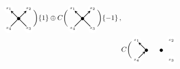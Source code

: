 \documentclass{compositio}
\theoremstyle{definition}
\numberwithin{equation}{section}
\begin{document}
\begin{align}
\begin{tikzpicture}[scale=0.5,baseline=-2pt, inner sep=1mm, >=stealth]
\node (x1) at (-1,1) [circle,inner sep=1.5pt, draw=white,fill= white] {{\tiny $x_{1}$}};
\node (x2) at (1,1) [circle,inner sep=1.5pt, draw=white,fill= white] {{\tiny $x_{2}$}};
\node (x3) at (1,-1) [circle,inner sep=1.5pt, draw=white,fill= white] {{\tiny $x_{3}$}};
\node (x4) at (-1,-1) [circle,inner sep=1.5pt, draw=white,fill= white] {{\tiny $x_{4}$}};
\node (bl) at (-1,-1) [circle] {};
\node (br) at (1,-1) [circle] {};
\node (tl) at (-1,1) [circle] {};
\node (tr) at (1,1) [circle] {};
\node (0) at (0,0) [circle,inner sep=1.5pt, thin,draw=black,fill= black] {};
\draw[-,  thick] (bl) -- (0); 
\draw[-,  thick] (br) -- (0); 
\draw[->,  thick] (0) -- (tl); 
\draw[->,  thick] (0) -- (tr); 
\end{tikzpicture} 
\bigg)
\{ 1\}
\oplus
C \bigg( 
\begin{tikzpicture}[scale=0.5,baseline=-2pt, inner sep=1mm, >=stealth]
\node (x1) at (-1,1) [circle,inner sep=1.5pt, draw=white,fill= white] {{\tiny $x_{1}$}};
\node (x2) at (1,1) [circle,inner sep=1.5pt, draw=white,fill= white] {{\tiny $x_{2}$}};
\node (x3) at (1,-1) [circle,inner sep=1.5pt, draw=white,fill= white] {{\tiny $x_{3}$}};
\node (x4) at (-1,-1) [circle,inner sep=1.5pt, draw=white,fill= white] {{\tiny $x_{4}$}};
\node (bl) at (-1,-1) [circle] {};
\node (br) at (1,-1) [circle] {};
\node (tl) at (-1,1) [circle] {};
\node (tr) at (1,1) [circle] {};
\node (0) at (0,0) [circle,inner sep=1.5pt, thin,draw=black,fill= black] {};
\draw[-,  thick] (bl) -- (0); 
\draw[-,  thick] (br) -- (0); 
\draw[->,  thick] (0) -- (tl); 
\draw[->,  thick] (0) -- (tr); 
\end{tikzpicture} 
\bigg)
\{ -1\}\, ,
\\
\label{MOYcatDecomp3}&
C \bigg( 
\begin{tikzpicture}[scale=0.5,baseline=-2pt, inner sep=1mm, >=stealth]
\node (x1) at (-1,1) [circle,inner sep=1.5pt, draw=white,fill= white] {{\tiny $x_{1}$}};
\node (x2) at (2.5,1) [circle,inner sep=1.5pt, draw=white,fill= white] {{\tiny $x_{2}$}};
\node (x3) at (2.5,-1) [circle,inner sep=1.5pt, draw=white,fill= white] {{\tiny $x_{3}$}};
\node (x4) at (-1,-1) [circle,inner sep=1.5pt, draw=white,fill= white] {{\tiny $x_{4}$}};
\node (centre) at (0,0.75) [circle] {};
\node (bl) at (-1,-1) [circle] {};
\node (br) at (2.5,-1) [circle] {};
\node (tl) at (-1,1) [circle] {};
\node (tr) at (2.5,1) [circle] {};
\node (0) at (0,0) [circle,inner sep=1.5pt, thin,draw=black,fill= black] {};
\node (02) at (1.5,0) [circle,inner sep=1.5pt, thin,draw=black,fill= black] {};
\draw[->,  thick] (bl) -- (0); 
\draw[->,  thick] (0) -- (tl); 

\end{tikzpicture}
\end{align}
\end{document}
